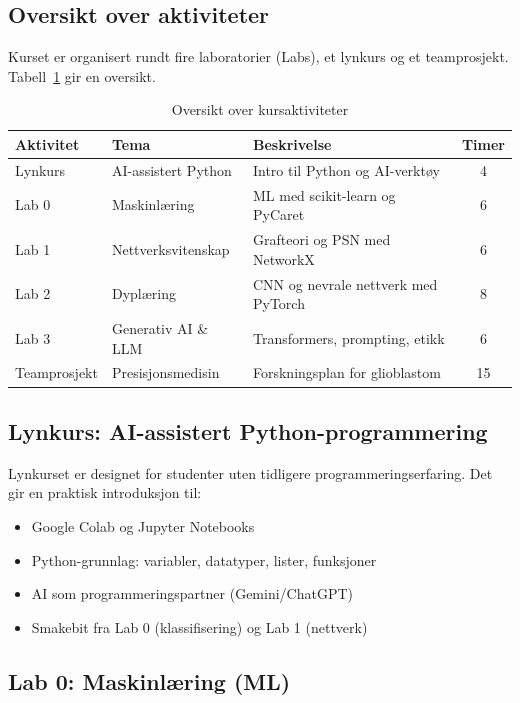 \documentclass[11pt,a4paper]{article}
\begin{document}
\subsection{Oversikt over aktiviteter}

Kurset er organisert rundt fire laboratorier (Labs), et lynkurs og et teamprosjekt. Tabell~\ref{tab:aktiviteter} gir en oversikt.

\begin{table}[htbp]
\centering
\caption{Oversikt over kursaktiviteter}
\label{tab:aktiviteter}
\begin{tabular}{@{}llp{6cm}c@{}}
\toprule
\textbf{Aktivitet} & \textbf{Tema} & \textbf{Beskrivelse} & \textbf{Timer} \\
\midrule
Lynkurs & AI-assistert Python & Intro til Python og AI-verktøy & 4 \\
Lab 0 & Maskinlæring & ML med scikit-learn og PyCaret & 6 \\
Lab 1 & Nettverksvitenskap & Grafteori og PSN med NetworkX & 6 \\
Lab 2 & Dyplæring & CNN og nevrale nettverk med PyTorch & 8 \\
Lab 3 & Generativ AI \& LLM & Transformers, prompting, etikk & 6 \\
\midrule
Teamprosjekt & Presisjonsmedisin & Forskningsplan for glioblastom & 15 \\
\bottomrule
\end{tabular}
\end{table}

\subsection{Lynkurs: AI-assistert Python-programmering}

Lynkurset er designet for studenter uten tidligere programmeringserfaring. Det gir en praktisk introduksjon til:

\begin{itemize}[nosep]
    \item Google Colab og Jupyter Notebooks
    \item Python-grunnlag: variabler, datatyper, lister, funksjoner
    \item AI som programmeringspartner (Gemini/ChatGPT)
    \item Smakebit fra Lab 0 (klassifisering) og Lab 1 (nettverk)
\end{itemize}

\subsection{Lab 0: Maskinlæring (ML)}
\end{document}
